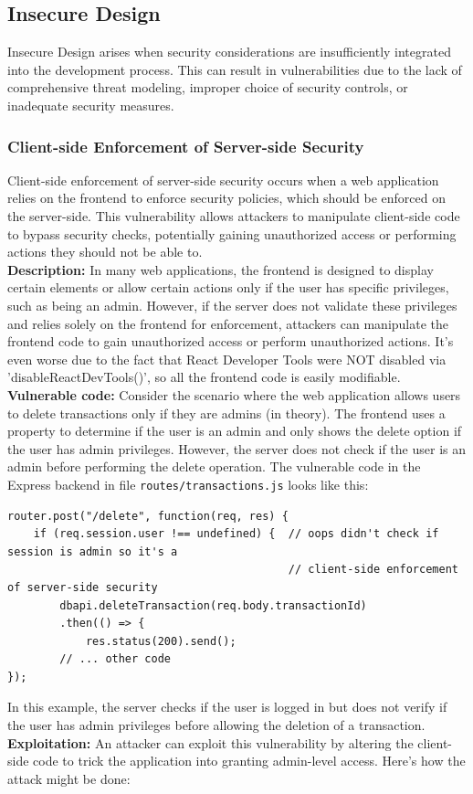 \documentclass[]{article}
\begin{document}
\subsection{Insecure Design}

Insecure Design arises when security considerations are insufficiently integrated into the development process. This can result in vulnerabilities due to the lack of comprehensive threat modeling, improper choice of security controls, or inadequate security measures.

\subsubsection{Client-side Enforcement of Server-side Security}

Client-side enforcement of server-side security occurs when a web application relies on the frontend to enforce security policies, which should be enforced on the server-side. This vulnerability allows attackers to manipulate client-side code to bypass security checks, potentially gaining unauthorized access or performing actions they should not be able to. \\ 
\textbf{Description:}
In many web applications, the frontend is designed to display certain elements or allow certain actions only if the user has specific privileges, such as being an admin. However, if the server does not validate these privileges and relies solely on the frontend for enforcement, attackers can manipulate the frontend code to gain unauthorized access or perform unauthorized actions. It's even worse due to the fact that React Developer Tools were NOT disabled via 'disableReactDevTools()', so all the frontend code is easily modifiable. \\ 
\textbf{Vulnerable code:}
Consider the scenario where the web application allows users to delete transactions only if they are admins (in theory). The frontend uses a property to determine if the user is an admin and only shows the delete option if the user has admin privileges. However, the server does not check if the user is an admin before performing the delete operation. The vulnerable code in the Express backend in file \texttt{routes/transactions.js} looks like this:

\begin{lstlisting}
router.post("/delete", function(req, res) {
    if (req.session.user !== undefined) {  // oops didn't check if session is admin so it's a
                                           // client-side enforcement of server-side security
        dbapi.deleteTransaction(req.body.transactionId)
        .then(() => {
            res.status(200).send();
        // ... other code
});
\end{lstlisting}
In this example, the server checks if the user is logged in but does not verify if the user has admin privileges before allowing the deletion of a transaction. \\ 
\textbf{Exploitation:}  
An attacker can exploit this vulnerability by altering the client-side code to trick the application into granting admin-level access. Here's how the attack might be done:
\end{document}

